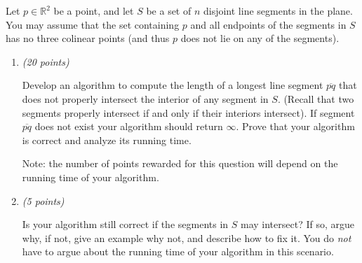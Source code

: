 \documentclass{article}
\newcommand{\withpoints}[1]{%
  \addtocounter{pointscounter}{#1} \printpoints{#1}
}
\newcommand{\printpoints}[1]{%
   \ifthenelse{#1 = 0}
              {}
              {\textit{(#1 points)}}\mbox{}
}
\newenvironment{question}[1][0]{\begin{tcolorbox}[parbox=false
                                      ,breakable=true
                                      ,enhanced jigsaw
                                      ,title=\bfseries Question
                                      \stepcounter{questionscounter}\arabic{questionscounter}
                                      \withpoints{#1}]
                         }
                         {\end{tcolorbox}}
\newenvironment{subquestions}{\begin{enumerate}[leftmargin=*
                                        ]}
                             {\end{enumerate}}
\newcommand{\subquestion}[1][0]{\item \withpoints{#1}}
\newcommand{\mkmbb}[1]{\ensuremath{\mathbb{#1}}\xspace}
\newcommand{\R}{\mkmbb{R}}
\begin{document}
  \begin{question}
    Let $p \in \R^2$ be a point, and let $S$ be a set of $n$ disjoint
    line segments in the plane. You may assume that the set containing
    $p$ and all endpoints of the segments in $S$ has no three colinear
    points (and thus $p$ does not lie on any of the segments).

    \begin{subquestions}
      \subquestion[20] Develop an algorithm to compute the length of a
      longest line segment $\overline{pq}$ that does not properly
      intersect the interior of any segment in $S$. (Recall that two
      segments properly intersect if and only if their interiors
      intersect). If segment $\overline{pq}$ does not exist your
      algorithm should return $\infty$. Prove that your algorithm is
      correct and analyze its running time.

      Note: the number of points rewarded for this question will
      depend on the running time of your algorithm.

      \subquestion[5] Is your algorithm still correct if the segments
      in $S$ may intersect? If so, argue why, if not, give an example
      why not, and describe how to fix it. You do \emph{not} have to
      argue about the running time of your algorithm in this scenario.
    \end{subquestions}

  \end{question}

\end{document}
